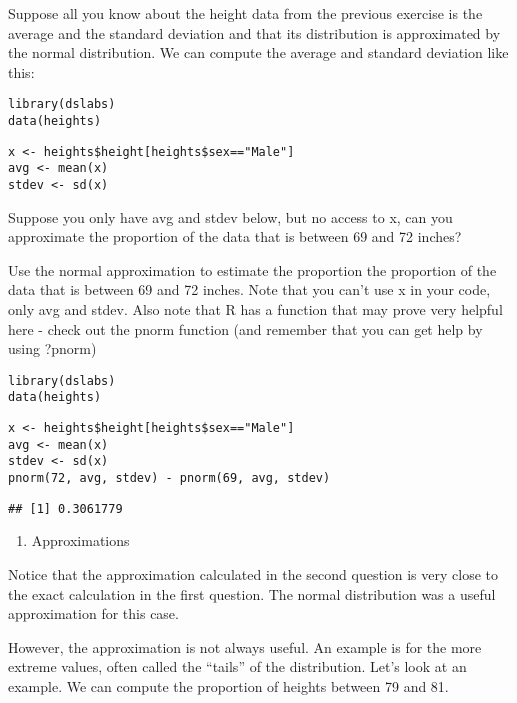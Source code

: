 \documentclass[]{article}
\providecommand{\tightlist}{%
  \setlength{\itemsep}{0pt}\setlength{\parskip}{0pt}}
\begin{document}
Suppose all you know about the height data from the previous exercise is
the average and the standard deviation and that its distribution is
approximated by the normal distribution. We can compute the average and
standard deviation like this:

\begin{verbatim}
library(dslabs)  
data(heights)  
\end{verbatim}

\begin{verbatim}
x <- heights$height[heights$sex=="Male"]  
avg <- mean(x)  
stdev <- sd(x)  
\end{verbatim}

Suppose you only have avg and stdev below, but no access to x, can you
approximate the proportion of the data that is between 69 and 72 inches?

Use the normal approximation to estimate the proportion the proportion
of the data that is between 69 and 72 inches. Note that you can't use x
in your code, only avg and stdev. Also note that R has a function that
may prove very helpful here - check out the pnorm function (and remember
that you can get help by using ?pnorm)

\begin{verbatim}
library(dslabs)
data(heights)
\end{verbatim}

\begin{verbatim}
x <- heights$height[heights$sex=="Male"]
avg <- mean(x)
stdev <- sd(x)
pnorm(72, avg, stdev) - pnorm(69, avg, stdev)
\end{verbatim}

\begin{verbatim}
## [1] 0.3061779
\end{verbatim}

\begin{enumerate}
\def\labelenumi{\arabic{enumi}.}
\setcounter{enumi}{2}
\tightlist
\item
  Approximations
\end{enumerate}

Notice that the approximation calculated in the second question is very
close to the exact calculation in the first question. The normal
distribution was a useful approximation for this case.

However, the approximation is not always useful. An example is for the
more extreme values, often called the ``tails'' of the distribution.
Let's look at an example. We can compute the proportion of heights
between 79 and 81.
\end{document}
